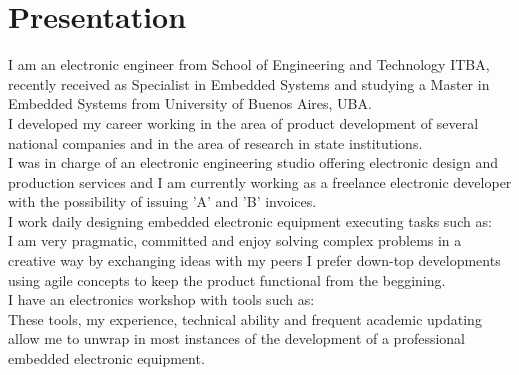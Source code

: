 \section{Presentation}
I am an electronic engineer from School of Engineering and Technology ITBA,
recently received as Specialist in Embedded Systems and studying a
Master in Embedded Systems from University of Buenos Aires, UBA.\\
I developed my career working in the area of product development of several
national companies and in the area of research in state institutions.\\
I was in charge of an electronic engineering studio offering electronic design
and production services and I am currently working as a freelance electronic
developer with the possibility of issuing 'A' and 'B' invoices.\\
I work daily designing embedded electronic equipment executing tasks such as: \\
I am very pragmatic, committed and enjoy solving complex problems in a creative way by exchanging ideas
with my peers I prefer down-top developments using agile concepts to keep the product functional from
the beggining.\\
I have an electronics workshop with tools such as:\\
These tools, my experience, technical ability and frequent academic updating allow me to unwrap
in most instances of the development of a professional embedded electronic equipment.\\
